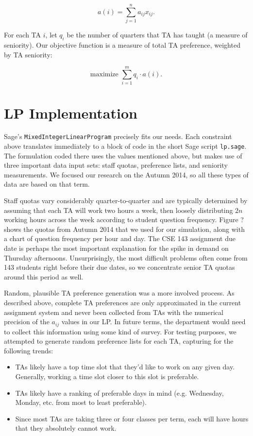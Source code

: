 \documentclass{article}
\begin{document}
\begin{multicols}{2}
\begin{equation}
a(i) = \sum_{j=1}^na_{ij}x_{ij}.
\end{equation}

For each TA $i$, let $q_i$ be the number of quarters that TA has taught (a measure of seniority). Our objective function is a measure of total TA preference, weighted by TA seniority:

\begin{equation}
\textrm{maximize } \sum_{i=1}^mq_i\cdot a(i).
\end{equation}

\section*{LP Implementation}

Sage's \texttt{MixedIntegerLinearProgram} precisely fits our needs. Each constraint above translates immediately to a block of code in the short Sage script \texttt{lp.sage}. The formulation coded there uses the values mentioned above, but makes use of three important data input sets: staff quotas, preference lists, and seniority measurements. We focused our research on the Autumn 2014, so all these types of data are based on that term.

Staff quotas vary considerably quarter-to-quarter and are typically determined by assuming that each TA will work two hours a week, then loosely distributing $2n$ working hours across the week according to student question frequency. Figure ? shows the quotas from Autumn 2014 that we used for our simulation, along with a chart of question frequency per hour and day. The CSE 143 assignment due date is perhaps the most important explanation for the spike in demand on Thursday afternoons. Unsurprisingly, the most difficult problems often come from 143 students right before their due dates, so we concentrate senior TA quotas around this period as well.

Random, plausible TA preference generation was a more involved process. As described above, complete TA preferences are only approximated in the current assignment system and never been collected from TAs with the numerical precision of the $a_{ij}$ values in our LP. In future terms, the department would need to collect this information using some kind of survey. For testing purposes, we attempted to generate random preference lists for each TA, capturing for the following trends:
\begin{itemize}
   \item TAs likely have a top time slot that they'd like to work on any given day. Generally, working a time slot closer to this slot is preferable.
   \item TAs likely have a ranking of preferable days in mind (e.g. Wednesday, Monday, etc. from most to least preferable).
   \item Since most TAs are taking three or four classes per term, each will have hours that they absolutely cannot work.
\end{itemize}


\end{multicols}
\end{document}
